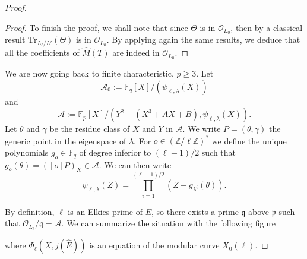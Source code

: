 \documentclass[12pt]{article}
\theoremstyle{plain}
\theoremstyle{definition}
\def\Z{\ensuremath{\mathbb{Z}}}
\def\F{\ensuremath{\mathbb{F}}}
\begin{document}
\begin{proof}
\begin{proof}
To finish the proof, we shall note that since $\Theta$ is in $\mathcal{O}_{L_0}$, then
by a classical result $\text{Tr}_{L_\ell/L'}(\Theta)$ is in $\mathcal{O}_{L_0}$. By
applying again the same results, we deduce that all the coefficients of $\widehat{M}(T)$
are indeed in $\mathcal{O}_{L_0}$.
\end{proof}

We are now going back to finite characteristic, $p\geq3$. Let
\begin{equation}
\mathcal{A}_0:=\F_q[X]/(\psi_{\ell,\lambda}(X))
\end{equation}
and
\begin{equation}
\mathcal{A}:=\F_p[X]/(Y^2-(X^3+AX+B),\psi_{\ell,\lambda}(X)).
\end{equation}
Let $\theta$ and $\gamma$ be the residue class of $X$ and $Y$ in $\mathcal{A}$.
We write $P = (\theta, \gamma)$ the generic point in the eigenspace of $\lambda$. 
For $o\in(\Z/\ell\Z)^{\ast}$ we define the unique polynomials 
$g_o\in\F_q$ of degree inferior to $(\ell-1)/2$ such that $g_o(\theta)= 
([o]P)_X \in\mathcal{A}$. We can then write 
\begin{equation}
\psi_{\ell,\lambda}(Z) = \prod_{i=1}^{(\ell-1)/2}{(Z - g_{\lambda^i}(\theta))}.
\end{equation}

By definition, $\ell$ is an Elkies prime of $E$, so there exists a prime 
$\mathfrak{q}$ above $\mathfrak{p}$ such that $\mathcal{O}_{L_\ell}/\mathfrak{q} =
\mathcal{A}$. We can summarize the situation with the following figure

\begin{center}
\end{center}
where $\Phi_\ell(X,j(\widehat{E}))$ is an equation of the modular curve 
$X_0(\ell)$.


\end{proof}
\end{document}
